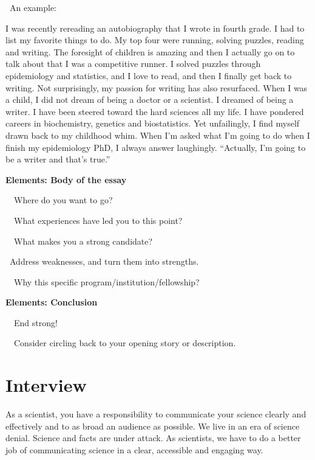 \documentclass[a4paper, 12pt]{article}
\begin{document}
\newpage\par\textbullet\ An example:
\par I was recently rereading an autobiography that I wrote in fourth grade. I had to list my favorite things to do.
My top four were running, solving puzzles, reading and writing. The foresight of children is amazing and then I actually go on to talk about that I was a competitive runner.
I solved puzzles through epidemiology and statistics, and I love to read, and then I finally get back to writing.
Not surprisingly, my passion for writing has also resurfaced. When I was a child, I did not dream of being a doctor or a scientist.
I dreamed of being a writer. I have been steered toward the hard sciences all my life. I have pondered careers in biochemistry, genetics and biostatistics.
Yet unfailingly, I find myself drawn back to my childhood whim. When I'm asked what I'm going to do when I finish my epidemiology PhD, I always answer laughingly.
``Actually, I'm going to be a writer and that's true.''

\textbf{Elements: Body of the essay}
\par\ \textbullet\ Where do you want to go?
\par\ \textbullet\ What experiences have led you to this point?
\par\ \textbullet\ What makes you a strong candidate?
\par\quad\textopenbullet\ Address weaknesses, and turn them into strengths.
\par\ \textbullet\ Why this specific program/institution/fellowship?

\textbf{Elements: Conclusion}
\par\ \textbullet\ End strong!
\par\ \textbullet\ Consider circling back to your opening story or description.

\newpage\quad

\newpage\section{Interview}

\par As a scientist, you have a responsibility to communicate your science clearly and effectively and to as broad an audience as possible.
We live in an era of science denial. Science and facts are under attack.
As scientists, we have to do a better job of communicating science in a clear, accessible and engaging way.
\end{document}
